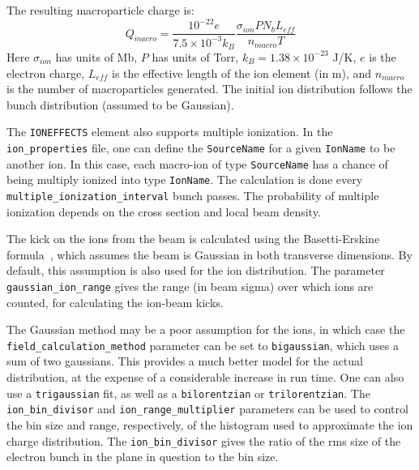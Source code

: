 The resulting macroparticle charge is:
\begin{equation}
Q_{macro} = \frac{10^{-22} e}{7.5\times10^{-3} k_B} \frac{\sigma_{ion} P N_b L_{eff}}{n_{macro} T}
\end{equation}
Here $\sigma_{ion}$ has units of Mb, $P$ has units of Torr, $k_B = 1.38\times10^{-23}$ J/K, $e$ is the electron charge, $L_{eff}$ is the effective length of the ion element (in m), and $n_{macro}$ is the number of macroparticles generated.
The initial ion distribution follows the bunch distribution (assumed to be Gaussian).

The \verb|IONEFFECTS| element also supports multiple ionization.  In the \verb|ion_properties| file, one can define the \verb|SourceName| for a given \verb|IonName| to be another ion.  In this case, each macro-ion of type \verb|SourceName| has a chance of being multiply ionized into type \verb|IonName|.  The calculation is done every \verb|multiple_ionization_interval| bunch passes.  The probability of multiple ionization depends on the cross section and local beam density.



The kick on the ions from the beam is calculated using the
Basetti-Erskine formula~\cite{Bassetti}, which assumes the beam is
Gaussian in both transverse dimensions.  By default, this assumption is also used for the ion distribution.  The parameter \verb|gaussian_ion_range| gives the range (in beam sigma) over which ions are counted, for calculating the ion-beam kicks.  

The Gaussian method may be a poor assumption for
the ions, in which case the \verb|field_calculation_method| parameter can be
set to \verb|bigaussian|, which uses a sum of two gaussians. This provides
a much better model for the actual distribution, at the expense of a considerable
increase in run time. One can also use a \verb|trigaussian| fit, as well as a \verb|bilorentzian| or \verb|trilorentzian|.  The \verb|ion_bin_divisor| and \verb|ion_range_multiplier| parameters can
be used to control the bin size and range, respectively, of the histogram used to 
approximate the ion charge distribution.
The \verb|ion_bin_divisor| gives the ratio of the rms size of the electron bunch
in the plane in question to the bin size.

